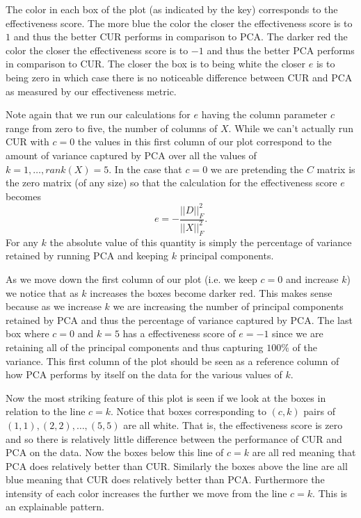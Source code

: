 \documentclass{book}
\begin{document}
The color in each box of the plot (as indicated by the key) corresponds to the effectiveness score. The more blue the color the closer the effectiveness score is to $1$ and thus the better CUR performs in comparison to PCA. The darker red the color the closer the effectiveness score is to $-1$ and thus the better PCA performs in comparison to CUR. The closer the box is to being white the closer $e$ is to being zero in which case there is no noticeable difference between CUR and PCA as measured by our effectiveness metric. 

Note again that we run our calculations for $e$ having the column parameter $c$ range from zero to five, the number of columns of $X$. While we can't actually run CUR with $c=0$ the values in this first column of our plot correspond to the amount of variance captured by PCA over all the values of $k=1,\ldots,rank(X)=5$. In the case that $c=0$ we are pretending the $C$ matrix is the zero matrix (of any size) so that the calculation for the effectiveness score $e$ becomes
$$
e=-\frac{||D||_F^2}{||X||_F^2}.
$$
For any $k$ the absolute value of this quantity is simply the percentage of variance retained by running PCA and keeping $k$ principal components. 

As we move down the first column of our plot (i.e. we keep $c=0$ and increase $k$) we notice that as $k$ increases the boxes become darker red. This makes sense because as we increase $k$ we are increasing the number of principal components retained by PCA and thus the percentage of variance captured by PCA. The last box where $c=0$ and $k=5$ has a effectiveness score of $e=-1$ since we are retaining all of the principal components and thus capturing $100\%$ of the variance. This first column of the plot should be seen as a reference column of how PCA performs by itself on the data for the various values of $k$. 

Now the most striking feature of this plot is seen if we look at the boxes in relation to the line $c=k$. Notice that boxes corresponding to $(c,k)$ pairs of $(1,1),(2,2),\ldots,(5,5)$ are all white. That is, the effectiveness score is zero and so there is relatively little difference between the performance of CUR and PCA on the data. Now the boxes below this line of $c=k$ are all red meaning that PCA does relatively better than CUR. Similarly the boxes above the line are all blue meaning that CUR does relatively better than PCA. Furthermore the intensity of each color increases the further we move from the line $c=k$. This is an explainable pattern. 
\end{document}

